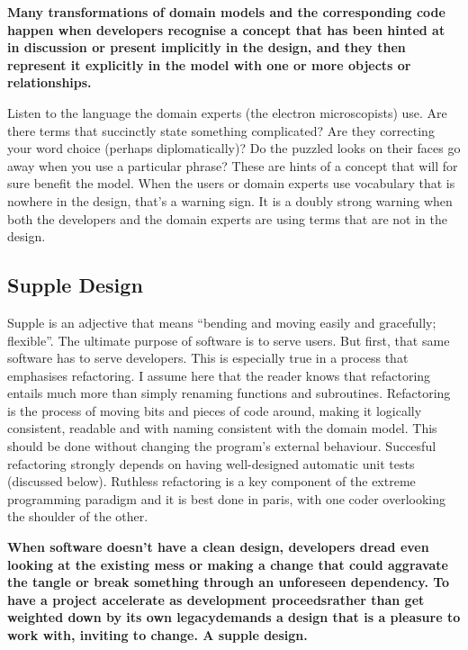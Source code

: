 \documentclass[a4paper,11pt]{article}
\begin{document}
\textbf{Many transformations of domain models and the corresponding code happen when developers recognise a concept that has been hinted at in discussion or present implicitly in the design, and they then represent it explicitly in the model with one or more objects or relationships.}

Listen to the language the domain experts (the electron microscopists) use. Are there terms that succinctly state something complicated? Are they correcting your word choice (perhaps diplomatically)? Do the puzzled looks on their faces go away when you use a particular phrase? These are hints of a concept that will for sure benefit the model. When the users or domain experts use vocabulary that is nowhere in the design, that's a warning sign. It is a doubly strong warning when both the developers and the domain experts are using terms that are not in the design.

\subsection{Supple Design}
Supple is an adjective that means ``bending and moving easily and gracefully; flexible''. The ultimate purpose of software is to serve users. But first, that same software has to serve developers. This is especially true in a process that emphasises refactoring. I assume here that the reader knows that refactoring entails much more than simply renaming functions and subroutines. Refactoring is the process of moving bits and pieces of code around, making it logically consistent, readable and with naming consistent with the domain model. This should be done without changing the program's external behaviour. Succesful refactoring strongly depends on having well-designed automatic unit tests (discussed below). Ruthless refactoring is a key component of the extreme programming paradigm and it is best done in paris, with one coder overlooking the shoulder of the other.

\textbf{When software doesn't have a clean design, developers dread even looking at the existing mess or making a change that could aggravate the tangle or break something through an unforeseen dependency. To have a project accelerate as development proceeds\textemdash{}rather than get weighted down by its own legacy\textemdash{}demands a design that is a pleasure to work with, inviting to change. A supple design.}
\end{document}
